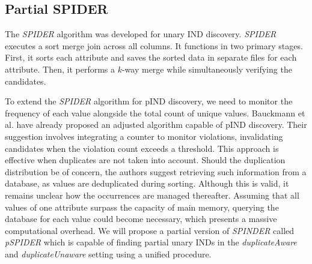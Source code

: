 \subsection{Partial SPIDER}

The \textit{SPIDER} algorithm \cite{bauckmann2006efficiently} was developed for unary IND discovery. \textit{SPIDER} executes a sort merge join across all columns. It functions in two primary stages. First, it sorts each attribute and saves the sorted data in separate files for each attribute. Then, it performs a $k$-way merge while simultaneously verifying the candidates.

To extend the \textit{SPIDER} algorithm for pIND discovery, we need to monitor the frequency of each value alongside the total count of unique values. Bauckmann et al. have already proposed an adjusted algorithm capable of pIND discovery. Their suggestion involves integrating a counter to monitor violations, invalidating candidates when the violation count exceeds a threshold. This approach is effective when duplicates are not taken into account. Should the duplication distribution be of concern, the authors suggest retrieving such information from a database, as values are deduplicated during sorting. Although this is valid, it remains unclear how the occurrences are managed thereafter. Assuming that all values of one attribute surpass the capacity of main memory, querying the database for each value could become necessary, which presents a massive computational overhead. We will propose a partial version of \textit{SPINDER} called \textit{pSPIDER} which is capable of finding partial unary INDs in the \textit{duplicateAware} and \textit{duplicateUnaware} setting using a unified procedure.

